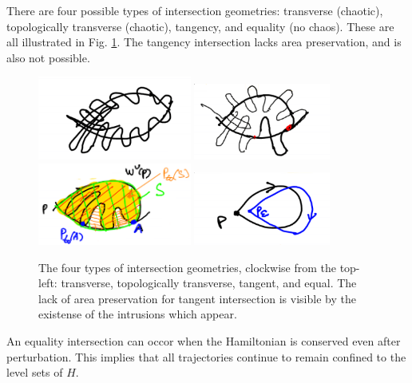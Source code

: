 There are four possible types of intersection geometries: transverse (chaotic), topologically transverse (chaotic), tangency, and equality (no chaos). These are all illustrated in Fig. \ref{fig:intersection_types}. The tangency intersection lacks area preservation, and is also not possible.

\begin{figure}[h!]
	\centering
	\includegraphics[width=0.45\textwidth]{figures/ch8/10intersection_geometry_A.png}
	\includegraphics[width=0.4\textwidth]{figures/ch8/10intersection_geometry_B.png}
	\includegraphics[width=0.45\textwidth]{figures/ch8/10intersection_geometry_C.png}
	\includegraphics[width=0.4\textwidth]{figures/ch8/10intersection_geometry_D.png}
	\caption{The four types of intersection geometries, clockwise from the top-left: transverse, topologically transverse, tangent, and equal. The lack of area preservation for tangent intersection is visible by the existense of the intrusions which appear.}
	\label{fig:intersection_types}
\end{figure}

An equality intersection can occor when the Hamiltonian is conserved even after perturbation. This implies that all trajectories continue to remain confined to the level sets of $H$. 


